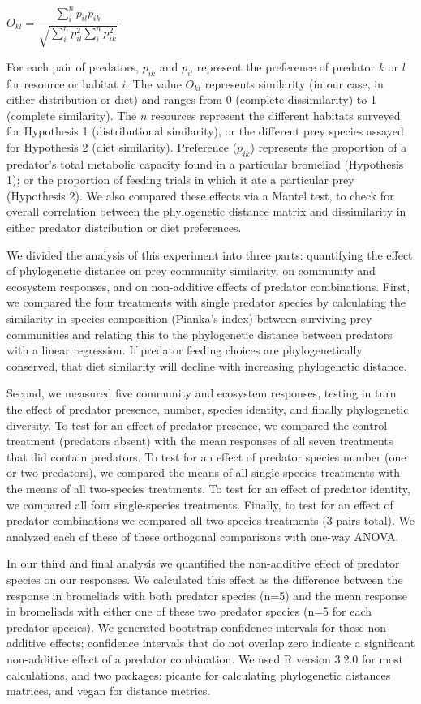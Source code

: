 \(O_{kl}=\dfrac{\sum_i^n{p_{il} p_{ik}}}{\sqrt{\sum_i^n{p_{il}^2} \sum_i^n{p_{ik}^2}}}\)

For each pair of predators, \(p_{ik}\) and \(p_{il}\) represent the
preference of predator \(k\) or \(l\) for resource or habitat \(i\). The
value \(O_{kl}\) represents similarity (in our case, in either
distribution or diet) and ranges from 0 (complete dissimilarity) to 1
(complete similarity). The \(n\) resources represent the different
habitats surveyed for Hypothesis 1 (distributional similarity), or the
different prey species assayed for Hypothesis 2 (diet similarity).
Preference (\(p_{ik}\)) represents the proportion of a predator's total
metabolic capacity found in a particular bromeliad (Hypothesis 1); or
the proportion of feeding trials in which it ate a particular prey
(Hypothesis 2). We also compared these effects via a Mantel test, to
check for overall correlation between the phylogenetic distance matrix
and dissimilarity in either predator distribution or diet preferences.

We divided the analysis of this experiment into three parts: quantifying
the effect of phylogenetic distance on prey community similarity, on
community and ecosystem responses, and on non-additive effects of
predator combinations. First, we compared the four treatments with
single predator species by calculating the similarity in species
composition (Pianka's index) between surviving prey communities and
relating this to the phylogenetic distance between predators with a
linear regression. If predator feeding choices are phylogenetically
conserved, that diet similarity will decline with increasing
phylogenetic distance.

Second, we measured five community and ecosystem responses, testing in
turn the effect of predator presence, number, species identity, and
finally phylogenetic diversity. To test for an effect of predator
presence, we compared the control treatment (predators absent) with the
mean responses of all seven treatments that did contain predators. To
test for an effect of predator species number (one or two predators), we
compared the means of all single-species treatments with the means of
all two-species treatments. To test for an effect of predator identity,
we compared all four single-species treatments. Finally, to test for an
effect of predator combinations we compared all two-species treatments
(3 pairs total). We analyzed each of these of these orthogonal
comparisons with one-way ANOVA.

In our third and final analysis we quantified the non-additive effect of
predator species on our responses. We calculated this effect as the
difference between the response in bromeliads with both predator species
(n=5) and the mean response in bromeliads with either one of these two
predator species (n=5 for each predator species). We generated bootstrap
confidence intervals for these non-additive effects; confidence
intervals that do not overlap zero indicate a significant non-additive
effect of a predator combination. We used R version 3.2.0 \citep{rcore}
for most calculations, and two packages: picante \citep{picante} for
calculating phylogenetic distances matrices, and vegan \citep{vegan} for
distance metrics.


